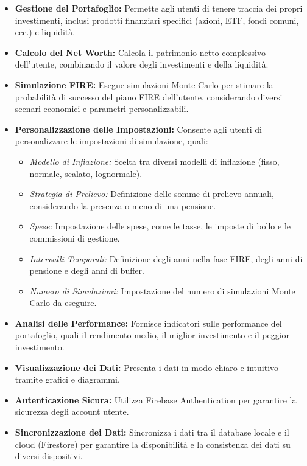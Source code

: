 \documentclass{article}
\begin{document}
\begin{itemize}
    \item \textbf{Gestione del Portafoglio:} Permette agli utenti di tenere
    traccia dei propri investimenti, inclusi prodotti finanziari specifici
    (azioni, ETF, fondi comuni, ecc.) e liquidità.
    \item \textbf{Calcolo del Net Worth:} Calcola il patrimonio netto
    complessivo dell'utente, combinando il valore degli investimenti e della
    liquidità.
    \item \textbf{Simulazione FIRE:} Esegue simulazioni Monte Carlo per stimare
    la probabilità di successo del piano FIRE dell'utente, considerando diversi
    scenari economici e parametri personalizzabili.
    \item \textbf{Personalizzazione delle Impostazioni:} Consente agli utenti di
    personalizzare le impostazioni di simulazione, quali:
    \begin{itemize}
        \item \textit{Modello di Inflazione:} Scelta tra diversi modelli di
        inflazione (fisso, normale, scalato, lognormale).
        \item \textit{Strategia di Prelievo:} Definizione delle somme di
        prelievo annuali, considerando la presenza o meno di una pensione.
        \item \textit{Spese:} Impostazione delle spese, come le tasse, le
        imposte di bollo e le commissioni di gestione.
        \item \textit{Intervalli Temporali:} Definizione degli anni nella fase
        FIRE, degli anni di pensione e degli anni di buffer.
        \item \textit{Numero di Simulazioni:} Impostazione del numero di
        simulazioni Monte Carlo da eseguire.
    \end{itemize}
    \item \textbf{Analisi delle Performance:} Fornisce indicatori sulle
    performance del portafoglio, quali il rendimento medio, il miglior
    investimento e il peggior investimento.
    \item \textbf{Visualizzazione dei Dati:} Presenta i dati in modo chiaro e
    intuitivo tramite grafici e diagrammi.
    \item \textbf{Autenticazione Sicura:} Utilizza Firebase Authentication per
    garantire la sicurezza degli account utente.
    \item \textbf{Sincronizzazione dei Dati:} Sincronizza i dati tra il database
    locale e il cloud (Firestore) per garantire la disponibilità e la
    consistenza dei dati su diversi dispositivi.
\end{itemize}
\end{document}
